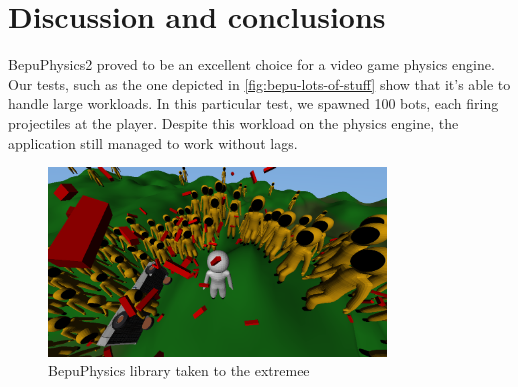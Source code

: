 \chapter{Discussion and conclusions}

BepuPhysics2 proved to be an excellent choice for a video game physics engine.
Our tests, such as the one depicted in \autoref{fig:bepu-lots-of-stuff} show that it's able to handle large workloads.
In this particular test, we spawned 100 bots, each firing projectiles at the player.
Despite this workload on the physics engine, the application still managed to work without lags.
\begin{figure}[h] %
    \centering
    \includegraphics[width=0.8\textwidth]{chapters/discussion_and_conclusions/resources/lots-of-stuff.png}
    \caption{BepuPhysics library taken to the extremee}
    \label{fig:bepu-lots-of-stuff}
\end{figure}

